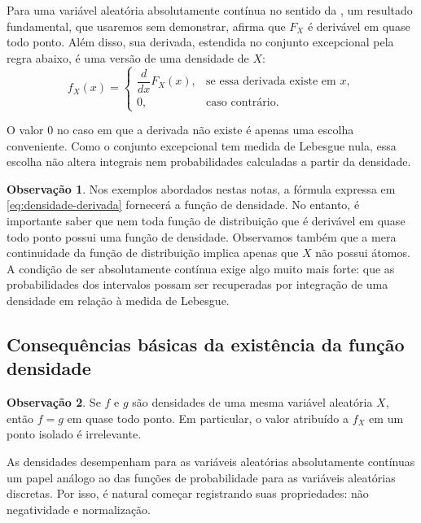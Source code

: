 \documentclass[12pt,portuguese]{article}
\theoremstyle{definition}
\newtheorem{remark}[remark]{Observação}
\theoremstyle{plainexercise}
\theoremstyle{starredexercise}
\theoremstyle{definition}
\begin{document}
Para uma variável aleatória absolutamente contínua no sentido da
, um resultado fundamental, que usaremos sem demonstrar,
afirma que $F_X$ é derivável em quase todo ponto. Além disso, sua derivada,
estendida no conjunto excepcional pela regra abaixo, é uma versão de uma
densidade de $X$:
\begin{equation}\label{eq:densidade-derivada}
  f_X(x) =
  \begin{cases}
    \dfrac{d}{dx} F_X(x), & \text{se essa derivada existe em } x, \\[0.5cm]
    0, & \text{caso contrário}.
  \end{cases}
\end{equation}

O valor $0$ no caso em que a derivada não existe é apenas uma escolha
conveniente. Como o conjunto excepcional tem medida de Lebesgue nula, essa
escolha não altera integrais nem probabilidades calculadas a partir da
densidade.

\begin{remark}
Nos exemplos abordados nestas notas, a fórmula expressa em \eqref{eq:densidade-derivada} 
fornecerá a função de densidade. No entanto, é importante saber que nem toda função de
distribuição que é derivável em quase todo ponto possui uma função de densidade. 
Observamos também que a mera continuidade da função de distribuição 
implica apenas que $X$ não possui átomos. A condição de ser
absolutamente contínua exige algo muito mais forte: que as probabilidades dos intervalos
possam ser recuperadas por integração de uma densidade em relação à medida de
Lebesgue.
\end{remark}

\subsection{Consequências básicas da existência da função densidade}

\begin{remark}\label{rem:densidade-qtp}
Se $f$ e $g$ são densidades de uma mesma variável aleatória $X$, então $f=g$
em quase todo ponto. Em particular, o valor atribuído a $f_X$ em um ponto
isolado é irrelevante.
\end{remark}

As densidades desempenham para as variáveis aleatórias absolutamente contínuas um papel
análogo ao das funções de probabilidade para as variáveis aleatórias discretas. Por isso,
é natural começar registrando suas propriedades: não negatividade e normalização.
\end{document}
